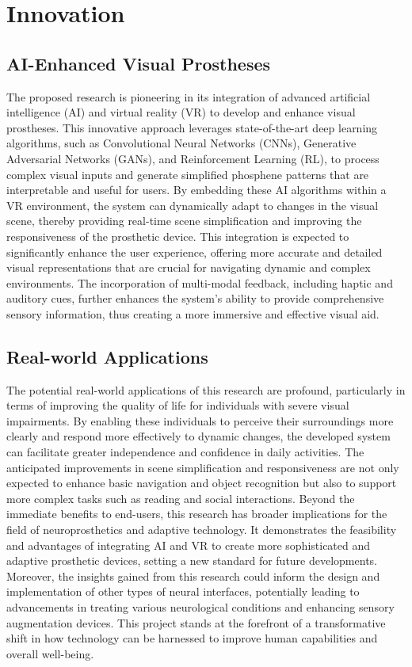 \documentclass[10pt]{article}
\begin{document}
\section*{Innovation}\label{sec:innovation}
\subsection*{AI-Enhanced Visual Prostheses}
The proposed research is pioneering in its integration of advanced artificial intelligence (AI) and virtual reality (VR) to develop and enhance visual prostheses. This innovative approach leverages state-of-the-art deep learning algorithms, such as Convolutional Neural Networks (CNNs), Generative Adversarial Networks (GANs), and Reinforcement Learning (RL), to process complex visual inputs and generate simplified phosphene patterns that are interpretable and useful for users. By embedding these AI algorithms within a VR environment, the system can dynamically adapt to changes in the visual scene, thereby providing real-time scene simplification and improving the responsiveness of the prosthetic device. This integration is expected to significantly enhance the user experience, offering more accurate and detailed visual representations that are crucial for navigating dynamic and complex environments. The incorporation of multi-modal feedback, including haptic and auditory cues, further enhances the system's ability to provide comprehensive sensory information, thus creating a more immersive and effective visual aid.

\subsection*{Real-world Applications}
The potential real-world applications of this research are profound,
particularly in terms of improving the quality of life for individuals with
severe visual impairments. By enabling these individuals to perceive their
surroundings more clearly and respond more effectively to dynamic changes, the
developed system can facilitate greater independence and confidence in daily
activities. The anticipated improvements in scene simplification and
responsiveness are not only expected to enhance basic navigation and object
recognition but also to support more complex tasks such as reading and social
interactions. Beyond the immediate benefits to end-users, this research has
broader implications for the field of neuroprosthetics and adaptive technology.
It demonstrates the feasibility and advantages of integrating AI and VR to
create more sophisticated and adaptive prosthetic devices, setting a new
standard for future developments. Moreover, the insights gained from this
research could inform the design and implementation of other types of neural
interfaces, potentially leading to advancements in treating various neurological
conditions and enhancing sensory augmentation devices. This project stands at
the forefront of a transformative shift in how technology can be harnessed to
improve human capabilities and overall well-being.
\end{document}
